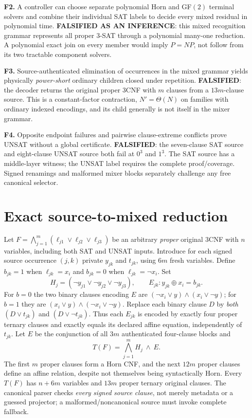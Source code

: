 \documentclass[11pt]{article}
\begin{document}
\noindent\textbf{F2.} A controller can choose separate polynomial Horn and GF$(2)$ terminal solvers and combine their individual SAT labels to decide every mixed residual in polynomial time. \textbf{FALSIFIED AS AN INFERENCE}: this mixed recognition grammar represents all proper 3-SAT through a polynomial many-one reduction. A polynomial exact join on every member would imply $P=NP$, not follow from its two tractable component solvers.

\noindent\textbf{F3.} Source-authenticated elimination of occurrences in the mixed grammar yields physically \emph{power-short} ordinary children closed under repetition. \textbf{FALSIFIED}: the decoder returns the original proper 3CNF with $m$ clauses from a $13m$-clause source. This is a constant-factor contraction, $N'=\Theta(N)$ on families with ordinary indexed encodings, and its child generally is not itself in the mixer grammar.

\noindent\textbf{F4.} Opposite endpoint failures and pairwise clause-extreme conflicts prove UNSAT without a global certificate. \textbf{FALSIFIED}: the seven-clause SAT source and eight-clause UNSAT source both fail at $0^3$ and $1^3$. The SAT source has a middle-layer witness; the UNSAT label requires the complete proof/coverage. Signed renamings and malformed mixer blocks separately challenge any free canonical selector.

\section{Exact source-to-mixed reduction}
Let $F=\bigwedge_{j=1}^{m}(\ell_{j1}\lor\ell_{j2}\lor\ell_{j3})$ be an arbitrary \emph{proper} original 3CNF with $n$ variables, including both SAT and UNSAT inputs. Introduce for each signed source occurrence $(j,k)$ private $y_{jk}$ and $t_{jk}$, using $6m$ fresh variables. Define $b_{jk}=1$ when $\ell_{jk}=x_i$ and $b_{jk}=0$ when $\ell_{jk}=\neg x_i$. Set
\[
 H_j=(\neg y_{j1}\lor\neg y_{j2}\lor\neg y_{j3}),\qquad
 E_{jk}: y_{jk}\oplus x_i=b_{jk}.
\]
For $b=0$ the two binary clauses encoding $E$ are $(\neg x_i\lor y)\land(x_i\lor\neg y)$; for $b=1$ they are $(x_i\lor y)\land(\neg x_i\lor\neg y)$. Replace each binary clause $D$ by \emph{both} $(D\lor t_{jk})$ and $(D\lor\neg t_{jk})$. Thus each $E_{jk}$ is encoded by exactly four proper ternary clauses and exactly equals its declared affine equation, independently of $t_{jk}$. Let $E$ be the conjunction of all $3m$ authenticated four-clause blocks and
\[
 T(F)=\bigwedge_{j=1}^{m}H_j\ \wedge\ E.
\]
The first $m$ proper clauses form a Horn CNF, and the next $12m$ proper clauses define an affine relation, despite not themselves being syntactically Horn. Every $T(F)$ has $n+6m$ variables and $13m$ proper ternary original clauses. The canonical parser checks \emph{every signed source clause}, not merely metadata or a guessed projector; a malformed/noncanonical source must invoke complete fallback.
\end{document}
